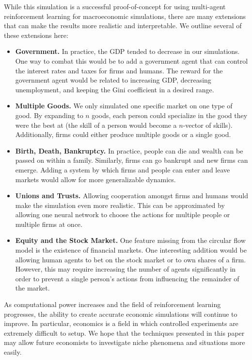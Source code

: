 \documentclass[twoside,twocolumn]{article}
\begin{document}
While this simulation is a successful proof-of-concept for using multi-agent reinforcement learning for  macroeconomic simulations, there are many extensions that can make the results more realistic and interpretable. We outline several of these extensions here:
\begin{itemize}
  \item \textbf{Government.} In practice, the GDP tended to decrease in our simulations. One way to combat this would be to add a government agent that can control the interest rates and taxes for firms and humans. The reward for the government agent would be related to increasing GDP, decreasing unemployment, and keeping the Gini coefficient in a desired range.
  \item \textbf{Multiple Goods.} We only simulated one specific market on one type of good. By expanding to $n$ goods, each person could specialize in the good they were the best at (the skill of a person would become a $n$-vector of skills). Additionally, firms could either produce multiple goods or a single good. 
  \item \textbf{Birth, Death, Bankruptcy.} In practice, people can die and wealth can be passed on within a family. Similarly, firms can go bankrupt and new firms can emerge. Adding a system by which firms and people can enter and leave markets would allow for more generalizable dynamics.
  \item \textbf{Unions and Trusts.} Allowing cooperation amongst firms and humans would make the simulation even more realistic. This can be approximated by allowing one neural network to choose the actions for multiple people or multiple firms at once.
  \item \textbf{Equity and the Stock Market.} One feature missing from the circular flow model is the existence of financial markets. One interesting addition would be allowing human agents to bet on the stock market or to own shares of a firm. However, this may require increasing the number of agents significantly in order to prevent a single person's actions from influencing the remainder of the market.
\end{itemize}

As computational power increases and the field of reinforcement learning progresses, the ability to create accurate economic simulations will continue to improve. In particular, economics is a field in which controlled experiments are extremely difficult to setup. We hope that the techniques presented in this paper may allow future economists to investigate niche phenomena and situations more easily.
\end{document}
